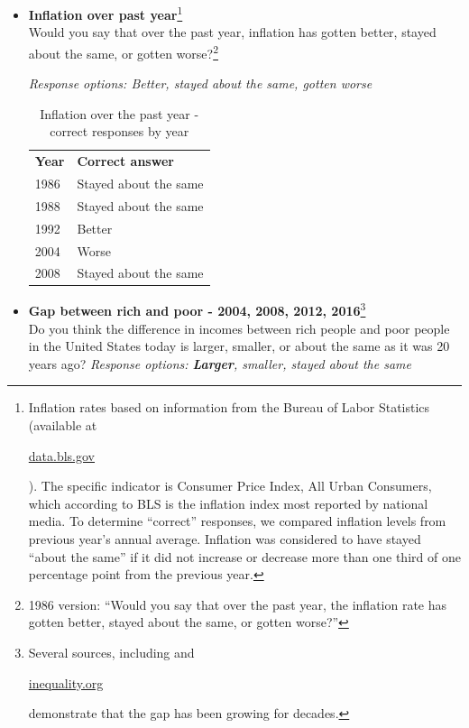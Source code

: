 \documentclass[12pt, letterpaper]{article}
\begin{document}
   \begin{itemize}
\item \textbf{Inflation over past year}\footnote{Inflation rates based on information from the Bureau of Labor Statistics (available at \begin{footnotesize} \url{data.bls.gov} \end{footnotesize}). The specific indicator is Consumer Price Index, All Urban Consumers, which according to BLS is the inflation index most reported by national media. To determine ``correct'' responses, we compared inflation levels from previous year's annual average. Inflation was considered to have stayed ``about the same'' if it did not increase or decrease more than one third of one percentage point from the previous year.} \\
Would you say that over the past year, inflation has gotten better, stayed about the same, or gotten worse?\footnote{1986 version: ``Would you say that over the past year, the inflation rate has gotten better, stayed about the same, or gotten worse?''} 

\textit{Response options: Better, stayed about the same, gotten worse}

         \begin{table}[H]
\centering
\caption{Inflation over the past year - correct responses by year}
\vspace{.1in}
\label{infl_corr_by_year}
\begin{tabular}{ll}
\textbf{Year} & \textbf{Correct answer}       \\
1986 & Stayed about the same                 \\
1988 & Stayed about the same                 \\
1992 & Better \\
2004 & Worse \\
2008 & Stayed about the same \\
\end{tabular}
\end{table}
   \end{itemize}   
   
  \begin{itemize}
\item \textbf{Gap between rich and poor - 2004, 2008, 2012, 2016}\footnote{Several sources, including \citet{Bartels2008} and \begin{footnotesize} \url{inequality.org} \end{footnotesize} demonstrate that the gap has been growing for decades.} \\
Do you think the difference in incomes between rich people and poor people in the United States today is larger, smaller, or about the same as it was 20 years ago?
\textit{Response options: \textbf{Larger}, smaller, stayed about the same}
\end{itemize}
 
\end{document}

